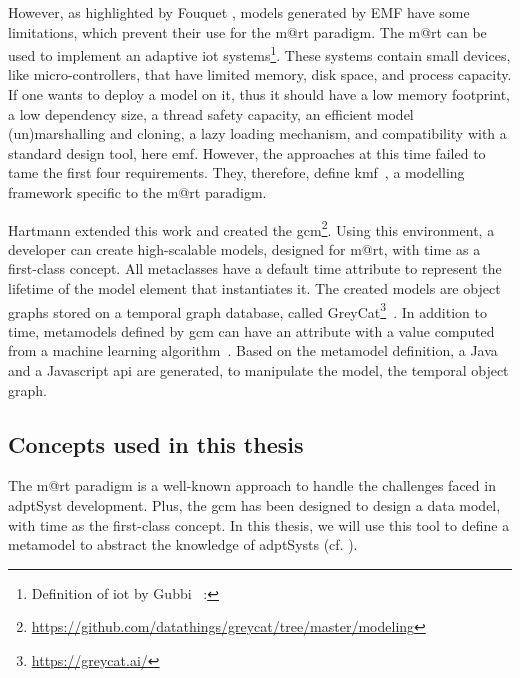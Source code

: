 However, as highlighted by Fouquet \etal \cite{DBLP:journals/corr/FrancoisNMDBPJ14, DBLP:conf/models/FouquetNMDBPJ12}, models generated by EMF have some limitations, which prevent their use for the \gls{m@rt} paradigm.
The \gls{m@rt} can be used to implement an adaptive \gls{iot} systems\footnote{Definition of \gls{iot} by Gubbi \etal~\cite{DBLP:journals/fgcs/GubbiBMP13}: }.
These systems contain small devices, like micro-controllers, that have limited memory, disk space, and process capacity.
If one wants to deploy a model on it, thus it should have a low memory footprint, a low dependency size, a thread safety capacity, an efficient model (un)marshalling and cloning, a lazy loading mechanism, and compatibility with a standard design tool, here \gls{emf}.
However, the approaches at this time failed to tame the first four requirements.
They, therefore, define \gls{kmf}~\cite{DBLP:journals/corr/FrancoisNMDBPJ14, DBLP:conf/models/FouquetNMDBPJ12}, a modelling framework specific to the \gls{m@rt} paradigm.

Hartmann extended this work and created the \gls{gcm}\footnote{\url{https://github.com/datathings/greycat/tree/master/modeling}}.
Using this environment, a developer can create high-scalable models, designed for \gls{m@rt}\cite{DBLP:conf/seke/0001FNMKT14, DBLP:conf/models/Moawad0FNKT15}, with time as a first-class concept.
All metaclasses have a default time attribute to represent the lifetime of the model element that instantiates it.
The created models are object graphs stored on a temporal graph database, called GreyCat\footnote{\url{https://greycat.ai/}}~\cite{DBLP:journals/is/HartmannFMRT19, DBLP:phd/basesearch/Hartmann16}.
In addition to time, \glspl{metamodel} defined by \gls{gcm} can have an attribute with a value computed from a machine learning algorithm~\cite{DBLP:journals/sosym/0001MFT19}.
Based on the \gls{metamodel} definition, a Java and a Javascript \gls{api} are generated, to manipulate the model, \ie the temporal object graph.


\subsection{Concepts used in this thesis}
The \gls{m@rt} paradigm is a well-known approach to handle the challenges faced in \gls{adptSyst} development.
Plus, the \gls{gcm} has been designed to design a data model, with time as the first-class concept.
In this thesis, we will use this tool to define a \gls{metamodel} to abstract the knowledge of \glspl{adptSyst} (cf. ).

